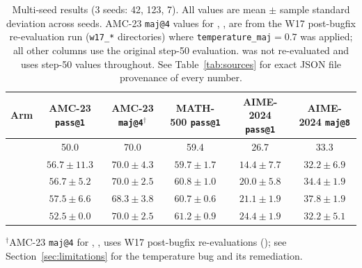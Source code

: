 \begin{table}[t]
\centering\small
\caption{Multi-seed results (3 seeds: 42, 123, 7).
All values are mean $\pm$ sample standard deviation across seeds.
AMC-23 \texttt{maj@4} values for \armA{}, \armB{}, \armC{} are from the W17
post-bugfix re-evaluation run (\texttt{w17\_*} directories) where
\texttt{temperature\_maj}$=0.7$ was applied; all other columns use the
original step-50 evaluation. \armD{} was not re-evaluated and uses
step-50 values throughout. See Table~\ref{tab:sources} for exact
JSON file provenance of every number.}
\label{tab:main}
\begin{tabular}{lccccc}
\toprule
Arm & AMC-23 \texttt{pass@1} & AMC-23 \texttt{maj@4}$^\dagger$ & MATH-500 \texttt{pass@1} & AIME-2024 \texttt{pass@1} & AIME-2024 \texttt{maj@8} \\
\midrule
\base{} & 50.0 & 70.0 & 59.4 & 26.7 & 33.3 \\
\armA{} & $56.7\pm11.3$ & $70.0\pm4.3$ & $59.7\pm1.7$ & $14.4\pm7.7$ & $32.2\pm6.9$ \\
\armB{} & $56.7\pm5.2$  & $70.0\pm2.5$ & $60.8\pm1.0$ & $20.0\pm5.8$ & $34.4\pm1.9$ \\
\armC{} & $57.5\pm6.6$  & $68.3\pm3.8$ & $60.7\pm0.6$ & $21.1\pm1.9$ & $37.8\pm1.9$ \\
\armD{} & $52.5\pm0.0$  & $70.0\pm2.5$ & $61.2\pm0.9$ & $24.4\pm1.9$ & $32.2\pm5.1$ \\
\bottomrule
\end{tabular}

\medskip
\noindent\small
$^\dagger$AMC-23 \texttt{maj@4} for \armA{}, \armB{}, \armC{} uses W17
post-bugfix re-evaluations (); see
Section~\ref{sec:limitations} for the temperature bug and its
remediation.
\end{table}
